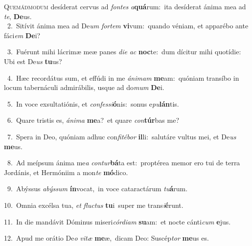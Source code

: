 \lettrine{\initial\textcolor{\initialcolor}{Q}}{uemádmodum} desíderat cervus ad \textit{fon}\-\textit{tes} \textit{a}\-\textbf{quá}rum:~\star ita desíderat ánima mea ad \textit{te}\-, \textbf{De}\-us.\\
{\numbfont\textcolor{\numbcolor}{~2.}}~Sitívit ánima mea ad De\textit{um} \textit{for}\-\textit{tem} \textbf{vi}\-vum:~\star quando véniam, et apparébo ante fáci\textit{em} \textbf{De}\-i?\par
{\numbfont\textcolor{\numbcolor}{~3.}}~Fuérunt mihi lácrimæ meæ panes \textit{di}\-\textit{e} \textit{ac} \textbf{noc}\-te:~\star dum dícitur mihi quotídie: Ubi est De\textit{us} \textbf{tu}\-us?\par
{\numbfont\textcolor{\numbcolor}{~4.}}~Hæc recordátus sum, et effúdi in me \textit{á}\-\textit{ni}\textit{mam} \textbf{me}\-am:~\star quóniam transíbo in locum tabernáculi admirábilis, usque ad do\textit{mum} \textbf{De}\-i.\par
{\numbfont\textcolor{\numbcolor}{~5.}}~In voce exsultatiónis, et \textit{con}\-\textit{fes}\textit{si}\textbf{ó}nis:~\star sonus e\-\textit{pu}\-\textbf{lán}tis.\par
{\numbfont\textcolor{\numbcolor}{~6.}}~Quare tristis es, \textit{á}\-\textit{ni}\textit{ma} \textbf{me}\-a?~\star et quare \textit{con}\-\textbf{túr}bas me?\par
{\numbfont\textcolor{\numbcolor}{~7.}}~Spera in Deo, quóniam adhuc con\-\textit{fi}\-\textit{té}\textit{bor} \textbf{il}\-li:~\star salutáre vultus mei, et De\textit{us} \textbf{me}\-us.\par
{\numbfont\textcolor{\numbcolor}{~8.}}~Ad meípsum ánima me\textit{a} \textit{con}\-\textit{tur}\textbf{bá}ta est:~\star proptérea memor ero tui de terra Jordánis, et Hermóniim a mon\textit{te} \textbf{mó}\-dico.\par
{\numbfont\textcolor{\numbcolor}{~9.}}~Abýssus \textit{a}\-\textit{býs}\textit{sum} \textbf{ín}\-vocat,~\star in voce cataractárum \textit{tu}\-\textbf{á}rum.\par
{\numbfont\textcolor{\numbcolor}{10.}}~Omnia excélsa tua, \textit{et} \textit{fluc}\-\textit{tus} \textbf{tu}\-i~\star super me trans\-\textit{i}\-\textbf{é}runt.\par
{\numbfont\textcolor{\numbcolor}{11.}}~In die mandávit Dóminus miseri\-\textit{cór}\-\textit{di}\textit{am} \textbf{su}\-am:~\star et nocte cánti\textit{cum} \textbf{e}\-jus.\par
{\numbfont\textcolor{\numbcolor}{12.}}~Apud me orátio De\textit{o} \textit{vi}\-\textit{tæ} \textbf{me}\-æ,~\star dicam Deo: Suscép\textit{tor} \textbf{me}\-us es.\par

